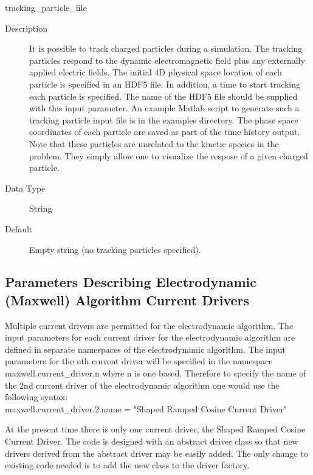 \documentclass[11pt]{amsart}
\begin{document}
tracking\_particle\_file
\begin{description}
\item [Description] It is possible to track charged particles during a
simulation.  The tracking particles respond to the dynamic electromagnetic
field plus any externally applied electric fields.  The initial 4D physical
space location of each particle is specified in an HDF5 file.  In addition, a
time to start tracking each particle is specified.  The name of the HDF5 file
should be supplied with this input parameter.  An example Matlab script to
generate such a tracking particle input file is in the examples directory.
The phase space coordinates of each particle are saved as part of the time
history output.  Note that these particles are unrelated to the kinetic species
in the problem.  They simply allow one to visualize the respose of a given
charged particle.
\item [Data Type] String
\item [Default] Empty string (no tracking particles specified).
\end{description}

\subsection*{Parameters Describing Electrodynamic (Maxwell) Algorithm Current Drivers}
Multiple current drivers are permitted for the electrodynamic algorithm.  The
input parameters for each current driver for the electrodynamic algorithm are
defined in separate namespaces of the electrodynamic algorithm.  The input
parameters for the nth current driver will be specified in the namespace
maxwell.current\_driver.n where n is one based.  Therefore to specify the name
of the 2nd current driver of the electrodynamic algorithm one would use the
following syntax: \\
maxwell.current\_driver.2.name = "Shaped Ramped Cosine Current Driver"

At the present time there is only one current driver, the Shaped Ramped Cosine
Current Driver.  The code is designed with an abstract driver class so that
new drivers derived from the abstract driver may be easily added.  The only
change to existing code needed is to add the new class to the driver factory.
\end{document}
